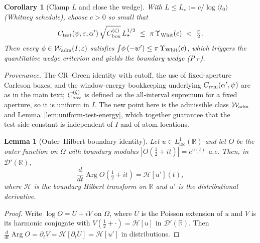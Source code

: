 \documentclass[11pt]{article}
\newcommand{\Hilb}{\mathcal H}
\newtheorem{lemma}[theorem]{Lemma}
\newtheorem{corollary}[theorem]{Corollary}
\theoremstyle{definition}
\theoremstyle{remark}
\DeclareMathOperator{\Arg}{Arg}
\begin{document}
\begin{corollary}[Clamp $L$ and close the wedge]
With $L\le L_\star:=c/\log\langle t_0\rangle$ (Whitney schedule), choose $c>0$ so small that
\[
 C_{\rm test}(\psi,\varepsilon,\alpha')\,\sqrt{C_{\rm box}^{(\zeta)}}\,L_\star^{1/2}\ \le\ \pi\,\Upsilon_{\rm Whit}(c)\ <\ \tfrac{\pi}{2}.
\]
Then every $\phi\in\mathcal W_{\rm adm}(I;\varepsilon)$ satisfies $\int \!\phi\,(-w')\le \pi\,\Upsilon_{\rm Whit}(c)$, which triggers the quantitative wedge criterion and yields the boundary wedge \textup{(P+)}.
\end{corollary}
\medskip
\noindent\emph{Provenance.} The CR–Green identity with cutoff, the use of fixed‑aperture Carleson boxes, and the window‑energy bookkeeping underlying $C_{\rm rem}(\alpha',\psi)$ are as in the main text; $C_{\rm box}^{(\zeta)}$ is defined as the all‑interval supremum for a fixed aperture, so it is uniform in $I$. The new point here is the admissible class $\mathcal W_{\rm adm}$ and Lemma~\ref{lem:uniform-test-energy}, which together guarantee that the test‑side constant is independent of $I$ and of atom locations.
\begin{lemma}[Outer–Hilbert boundary identity]\label{lem:outer-phase-HT}
Let $u\in L^1_{\mathrm{loc}}(\mathbb R)$ and let $O$ be the outer function on $\Omega$ with boundary modulus $|O(\tfrac12+it)|=e^{u(t)}$ a.e. Then, in $\mathcal D'(\mathbb R)$,
\[
\frac{d}{dt}\Arg O\!\left(\tfrac12+it\right)=\Hilb[u'](t),
\]
where $\Hilb$ is the boundary Hilbert transform on $\mathbb R$ and $u'$ is the distributional derivative.
\end{lemma}
\begin{proof}
Write $\log O=U+iV$ on $\Omega$, where $U$ is the Poisson extension of $u$ and $V$ is its harmonic conjugate with $V(\tfrac12+\cdot)=\Hilb[u]$ in $\mathcal D'(\mathbb R)$. Then $\tfrac{d}{dt}\Arg O=\partial_t V=\Hilb[\partial_t U]=\Hilb[u']$ in distributions.
\end{proof}
\end{document}
